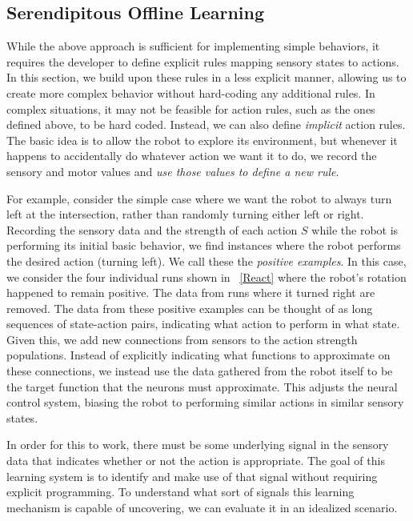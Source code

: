 \documentclass{frontiersSCNS}
\begin{document}
\subsection{Serendipitous Offline Learning} \label{learning}

While the above approach is sufficient for implementing simple behaviors, it requires the developer to define explicit rules mapping sensory states to actions. In this section, we build upon these
rules in a less explicit manner, allowing us to create more complex behavior
without hard-coding any additional rules.  In complex situations, it may not be 
feasible for action rules, such as the ones defined above, to be hard coded. Instead,
we can also define \textit{implicit} action rules. The basic idea is to allow
the robot to explore its environment, but whenever it happens to accidentally
do whatever action we want it to do, we record the sensory and motor 
values and \textit{use those values to define a new rule}.

For example, consider the simple case where we want the robot to always turn left at 
the intersection, rather than randomly turning either left or right. Recording 
the sensory data and the strength of each action $S$ while the robot is 
performing its initial basic behavior, we find instances where the robot 
performs the desired action (turning left). We call these the \textit{positive 
examples}. In this case, we consider the four individual runs shown in 
\figurename~\ref{React} where the robot's rotation happened to remain positive.  
The data from runs where it turned right are removed.  The data from these positive examples can 
be thought of as long sequences of state-action pairs, indicating what action 
to perform in what state. Given this, we add new connections from sensors to 
the action strength populations. Instead of explicitly indicating what functions 
to approximate on these connections, we instead use the data gathered from
the robot itself to be the target function that the neurons must approximate.
This adjusts the neural control system, biasing the robot to performing
similar actions in similar sensory states.

In order for this to work, there must be some underlying signal in the
sensory data that indicates whether or not the action is appropriate.  The
goal of this learning system is to identify and make use of that signal without
requiring explicit programming.  To understand what sort of signals this
learning mechanism is capable of uncovering, we can evaluate it in an
idealized scenario.
\end{document}
